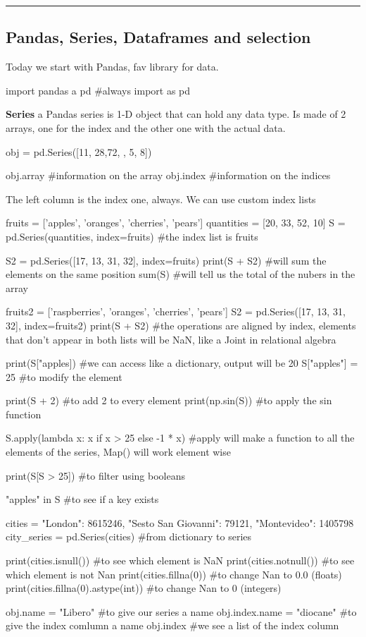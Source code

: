 \hrule
\subsection{Pandas, Series, Dataframes and selection}

Today we start with Pandas, fav library for data.

\begin{pythoncode}
    import pandas a pd #always import as pd
\end{pythoncode}

\textbf{Series} \ra a Pandas series is 1-D object that can hold any data type. Is made of 2 arrays, one for the index and the other one with the actual data.

\begin{pythoncode}
    obj = pd.Series([11, 28,72, , 5, 8])

    obj.array #information on the array
    obj.index #information on the indices
\end{pythoncode}

The left column is the index one, always. We can use custom index lists

\begin{pythoncode}
    fruits = ['apples', 'oranges', 'cherries', 'pears']
    quantities = [20, 33, 52, 10]
    S = pd.Series(quantities, index=fruits)
    #the index list is fruits

    S2 = pd.Series([17, 13, 31, 32], index=fruits)
    print(S + S2) #will sum the elements on the same position
    sum(S) #will tell us the total of the nubers in the array

    fruits2 = ['raspberries', 'oranges', 'cherries', 'pears']
    S2 = pd.Series([17, 13, 31, 32], index=fruits2)
    print(S + S2) #the operations are aligned by index, elements that don't appear in both lists will be NaN, like a Joint in relational algebra

    print(S["apples]) #we can access like a dictionary, output will be 20
    S["apples"] = 25 #to modify the element

    print(S + 2) #to add 2 to every element
    print(np.sin(S)) #to apply the sin function

    S.apply(lambda x: x if x > 25 else -1 * x) #apply will make a function to all the elements of the series, Map() will work element wise

    print(S[S > 25]) #to filter using booleans

    "apples" in S #to see if a key exists

    cities = {"London": 8615246,
    "Sesto San Giovanni": 79121,
    "Montevideo": 1405798}
    city_series = pd.Series(cities) #from dictionary to series

    print(cities.isnull()) #to see which element is NaN
    print(cities.notnull()) #to see which element is not Nan
    print(cities.fillna(0)) #to change Nan to 0.0 (floats)
    print(cities.fillna(0).astype(int)) #to change Nan to 0 (integers)

    obj.name = "Libero" #to give our series a name
    obj.index.name = "diocane" #to give the index comlumn a name
    obj.index #we see a list of the index column
\end{pythoncode}

